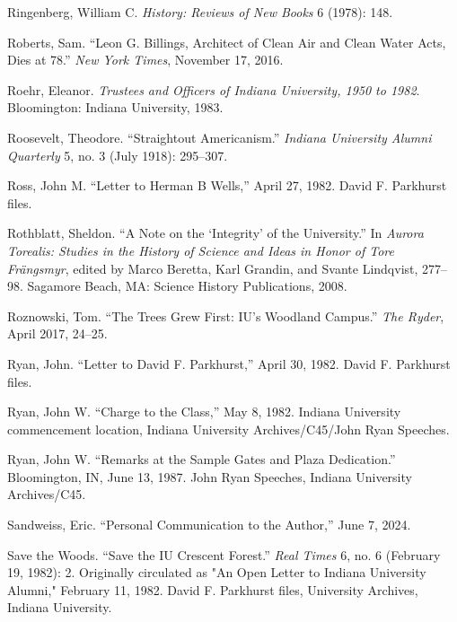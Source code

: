\documentclass[
  american,
  letterpaper,
]{scrreprt}
\newlength{\cslhangindent}
\newenvironment{CSLReferences}[2] %
 {\begin{list}{}{%
  \setlength{\itemindent}{0pt}
  \setlength{\leftmargin}{0pt}
  \setlength{\parsep}{0pt}
  \ifodd #1
   \setlength{\leftmargin}{\cslhangindent}
   \setlength{\itemindent}{-1\cslhangindent}
  \fi
  \setlength{\itemsep}{#2\baselineskip}}}
 {\end{list}}
\begin{document}
\begin{CSLReferences}{1}{0}
Ringenberg, William C. \emph{History: Reviews of New Books} 6 (1978):
148.

Roberts, Sam. {``Leon {G}. Billings, Architect of Clean Air and Clean
Water Acts, Dies at 78.''} \emph{New York Times}, November 17, 2016.

Roehr, Eleanor. \emph{Trustees and Officers of Indiana University, 1950
to 1982}. Bloomington: Indiana University, 1983.

Roosevelt, Theodore. {``Straightout Americanism.''} \emph{Indiana
University Alumni Quarterly} 5, no. 3 (July 1918): 295--307.

Ross, John M. {``Letter to Herman {B} Wells,''} April 27, 1982. David F.
Parkhurst files.

Rothblatt, Sheldon. {``A Note on the {`Integrity'} of the University.''}
In \emph{Aurora Torealis: Studies in the History of Science and Ideas in
Honor of Tore Frängsmyr}, edited by Marco Beretta, Karl Grandin, and
Svante Lindqvist, 277--98. Sagamore Beach, MA: Science History
Publications, 2008.

Roznowski, Tom. {``The Trees Grew First: IU's Woodland Campus.''}
\emph{The Ryder}, April 2017, 24--25.

Ryan, John. {``Letter to David {F.} Parkhurst,''} April 30, 1982. David
F. Parkhurst files.

Ryan, John W. {``Charge to the Class,''} May 8, 1982. Indiana University
commencement location, Indiana University Archives/C45/John Ryan
Speeches.

Ryan, John W. {``Remarks at the Sample Gates and Plaza Dedication.''}
Bloomington, IN, June 13, 1987. John Ryan Speeches, Indiana University
Archives/C45.

Sandweiss, Eric. {``Personal Communication to the Author,''} June 7,
2024.

Save the Woods. {``Save the IU Crescent Forest.''} \emph{Real Times} 6,
no. 6 (February 19, 1982): 2. Originally circulated as "An Open Letter
to Indiana University Alumni," February 11, 1982. David F. Parkhurst
files, University Archives, Indiana University.


\end{CSLReferences}
\end{document}
